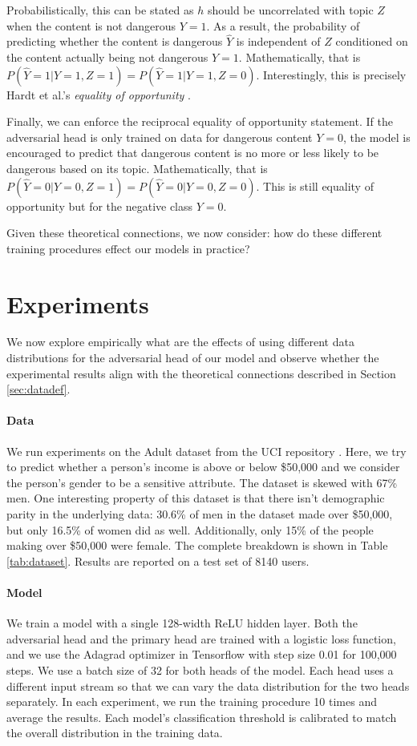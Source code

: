 \documentclass[sigconf,9pt]{acmart}
\begin{document}
Probabilistically, this can be stated as $h$ should be uncorrelated with topic $Z$ when the content is not dangerous $Y=1$. As a result, the probability of predicting whether the content is dangerous $\hat{Y}$ is independent of $Z$ conditioned on the content actually being not dangerous $Y=1$.  Mathematically, that is $P(\hat{Y} = 1| Y=1, Z=1) = P(\hat{Y} = 1| Y=1, Z=0)$.  Interestingly, this is precisely Hardt et al.'s \emph{equality of opportunity} \cite{hardt2016equality}.

Finally, we can enforce the reciprocal equality of opportunity statement.  If the adversarial head is only trained on data for dangerous content $Y=0$, the model is encouraged to predict that dangerous content is no more or less likely to be dangerous based on its topic.
Mathematically, that is $P(\hat{Y} = 0| Y=0, Z=1) = P(\hat{Y} = 0| Y=0, Z=0)$.
This is still equality of opportunity but for the negative class $Y=0$. 

Given these theoretical connections, we now consider: how do these different training procedures effect our models in practice?  


\section{Experiments}
We now explore empirically what are the effects of using different data distributions for the adversarial head of our model and observe whether the experimental results align with the theoretical connections described in Section \ref{sec:datadef}.

\paragraph{Data}
We run experiments on the Adult dataset from the UCI repository \cite{Lichman:2013}.  Here, we try to predict whether a person's income is above or below \$50,000 and we consider the person's gender to be a sensitive attribute.  The dataset is skewed with 67\% men.  One interesting property of this dataset is that there isn't demographic parity in the underlying data: 30.6\% of men in the dataset made over \$50,000, but only 16.5\% of women did as well.  Additionally, only 15\% of the people making over \$50,000 were female.  The complete breakdown is shown in Table \ref{tab:dataset}.  Results are reported on a test set of 8140 users.

\paragraph{Model} We train a model with a single 128-width ReLU hidden layer.  Both the adversarial head and the primary head are trained with a logistic loss function, and we use the Adagrad \cite{duchi2011adaptive} optimizer in Tensorflow with step size 0.01 for 100,000 steps.  We use a batch size of 32 for both heads of the model.  Each head uses a different input stream so that we can vary the data distribution for the two heads separately.  In each experiment, we run the training procedure 10 times and average the results.  Each model's classification threshold is calibrated to match the overall distribution in the training data.
\end{document}
